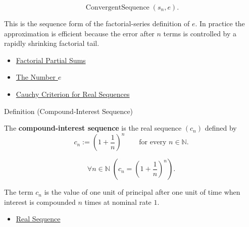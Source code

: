\begin{remark*}
\[
\operatorname{ConvergentSequence}(s_n,e).
\]
\end{remark*}

\begin{remark*}[Interpretation]
This is the sequence form of the factorial-series definition of $e$. In
practice the approximation is efficient because the error after $n$ terms is
controlled by a rapidly shrinking factorial tail.
\end{remark*}

\begin{dependencies}
\begin{itemize}
  \item \hyperref[def:factorial-partial-sums]{Factorial Partial Sums}
  \item \hyperref[def:number-e]{The Number $e$}
  \item \hyperref[thm:cauchy-criterion-real-sequences]{Cauchy Criterion for Real Sequences}
\end{itemize}
\end{dependencies}


\begin{definitionbox}{Definition (Compound-Interest Sequence)}
\begin{definition}
\label{def:compound-interest-sequence}
The \textbf{compound-interest sequence} is the real sequence $(c_n)$
defined by
\[
  c_n:=\left(1+\frac{1}{n}\right)^n
  \qquad\text{for every } n\in\mathbb{N}.
\]
\end{definition}
\end{definitionbox}

\begin{remark*}
\[
\forall n\in\mathbb{N}\;
\left(
  c_n=\left(1+\frac{1}{n}\right)^n
\right).
\]
\end{remark*}

\begin{remark*}[Interpretation]
The term $c_n$ is the value of one unit of principal after one unit of time
when interest is compounded $n$ times at nominal rate $1$.
\end{remark*}

\begin{dependencies}
\begin{itemize}
  \item \hyperref[def:real-sequence]{Real Sequence}
\end{itemize}
\end{dependencies}

